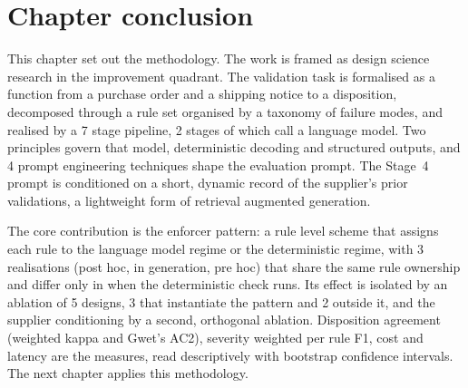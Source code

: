 \section{Chapter conclusion}

This chapter set out the methodology. The work is framed as design science research in the improvement quadrant. The validation task is formalised as a function from a purchase order and a shipping notice to a disposition, decomposed through a rule set organised by a taxonomy of failure modes, and realised by a 7 stage pipeline, 2 stages of which call a language model. Two principles govern that model, deterministic decoding and structured outputs, and 4 prompt engineering techniques shape the evaluation prompt. The Stage~4 prompt is conditioned on a short, dynamic record of the supplier's prior validations, a lightweight form of retrieval augmented generation.

The core contribution is the enforcer pattern: a rule level scheme that assigns each rule to the language model regime or the deterministic regime, with 3 realisations (post hoc, in generation, pre hoc) that share the same rule ownership and differ only in when the deterministic check runs. Its effect is isolated by an ablation of 5 designs, 3 that instantiate the pattern and 2 outside it, and the supplier conditioning by a second, orthogonal ablation. Disposition agreement (weighted kappa and Gwet's AC2), severity weighted per rule F1, cost and latency are the measures, read descriptively with bootstrap confidence intervals. The next chapter applies this methodology.